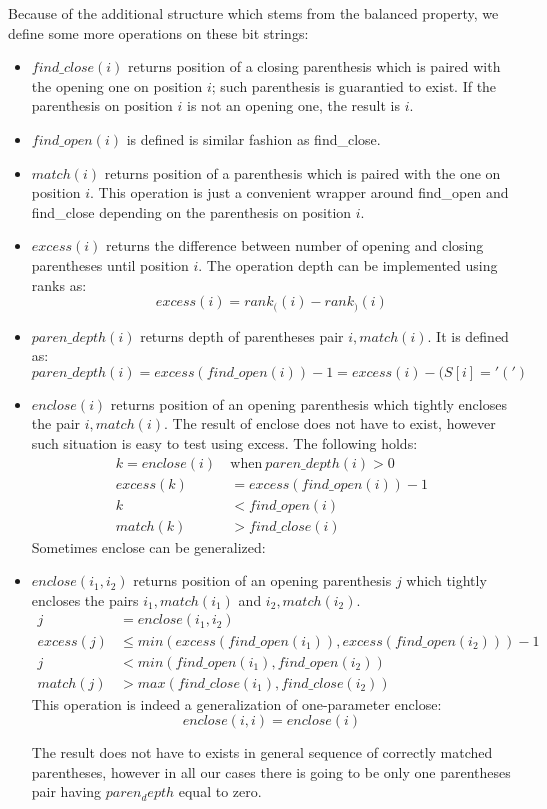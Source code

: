 Because of the additional structure which stems from the balanced property, we define some more operations on these bit strings:
\begin{itemize}
	\item \emph{$find\_close(i)$} returns position of a closing parenthesis which is paired with the opening one on position $i$; such parenthesis is guarantied to exist.
	If the parenthesis on position $i$ is not an opening one, the result is $i$.
	\item \emph{$find\_open(i)$} is defined is similar fashion as find\_close.
	\item \emph{$match(i)$} returns position of a parenthesis which is paired with the one on position $i$.
	This operation is just a convenient wrapper around find\_open and find\_close depending on the parenthesis on position $i$.
	\item \emph{$excess(i)$} returns the difference between number of opening and closing parentheses until position $i$.
	The operation depth can be implemented using ranks as: $$excess(i) = rank_((i) - rank_)(i)$$
	\item \emph{$paren\_depth(i)$} returns depth of parentheses pair $i, match(i)$.
	It is defined as: $$paren\_depth(i) = excess(find\_open(i)) - 1 = excess(i) - (S[i] = '(')$$
	\item \emph{$enclose(i)$} returns position of an opening parenthesis which tightly encloses the pair $i, match(i)$.
	The result of enclose does not have to exist, however such situation is easy to test using excess.
	The following holds:
	\begin{align*}
		k = enclose(i)\ &\textrm{when}\ paren\_depth(i) > 0\\
		excess(k) &= excess(find\_open(i)) - 1 \\
		k &< find\_open(i) \\
		match(k) &> find\_close(i)
	\end{align*}
	Sometimes enclose can be generalized:
	\item \emph{$enclose(i_1, i_2)$} returns position of an opening parenthesis $j$ which tightly encloses the pairs $i_1, match(i_1)$ and $i_2, match(i_2)$.
	\begin{align*}
	j &= enclose(i_1, i_2)\\
	excess(j) &\le min(excess(find\_open(i_1)), excess(find\_open(i_2))) - 1 \\
	j &< min(find\_open(i_1), find\_open(i_2)) \\
	match(j) &> max(find\_close(i_1), find\_close(i_2))
	\end{align*}
	This operation is indeed a generalization of one-parameter enclose:
	$$enclose(i, i) = enclose(i)$$
	
	The result does not have to exists in general sequence of correctly matched parentheses, however in all our cases there is going to be only one parentheses pair having $paren_depth$ equal to zero.
\end{itemize}

